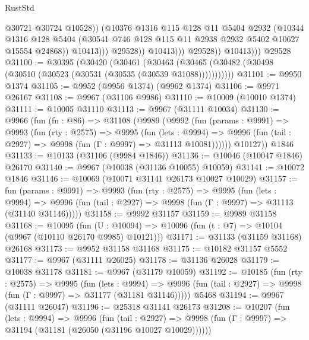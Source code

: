 \begin{lexlean}{RustStd}
\begin{coremodule}
                                @30721
                                @30724
                                @10528))
                            (@10376
                              @1316
                              @115
                              @128
                              @11
                              @5404
                              @2932
                              (@10344
                                @1316
                                @128
                                @5404
                                (@30541 @746 @128 @115 @11 @2938 @2932 @5402 @10627 @15554 @24868))
                              @10413)))
                        @29528))
                    @10413)))
              @29528))
          @10413)))
    @29528
@31100 := @30395
    (@30420
      (@30461
        (@30463 (@30465 (@30482 (@30498 (@30510 (@30523 (@30531 (@30535 (@30539 @31088)))))))))))
@31101 := @9950 @1374
@31105 := @9952 (@9956 @1374) (@9962 @1374)
@31106 := @9971 @26167
@31108 := @9967 (@31106 @9986)
@31110 := @10009 (@10010 @1374)
@31111 := @10005 @31110
@31113 := @9967 (@31111 @10034)
@31130 := @9966
    (fun (fn : @86) =>
    @31108
      (@9989
        (@9992
          (fun (params : @9991) =>
          @9993
            (fun (rty : @2575) =>
            @9995
              (fun (lets : @9994) =>
              @9996 (fun (tail : @2927) => @9998 (fun (Γ : @9997) => @31113 @10081))))))
        @10127))
    @1846
@31133 := @10133 (@31106 (@9984 @1846))
@31136 := @10046 (@10047 @1846) @26170
@31140 := @9967 (@10038 (@31136 @10055) @10059)
@31141 := @10072 @1846
@31146 := @10069 (@10071 @31141 @26173 @10027 @10029)
@31157 := fun (params : @9991) =>
  @9993
    (fun (rty : @2575) =>
    @9995
      (fun (lets : @9994) =>
      @9996 (fun (tail : @2927) => @9998 (fun (Γ : @9997) => @31113 (@31140 @31146)))))
@31158 := @9992 @31157
@31159 := @9989 @31158
@31168 := @10095
    (fun (U : @10094) => @10096 (fun (t : @7) => @10104 (@9967 (@10110 @26170 @9985) @10121)))
@31171 := @31133 (@31159 @31168) @26168
@31173 := @9952 @31158 @31168
@31175 := @10182 @31157 @5552
@31177 := @9967 (@31111 @26025)
@31178 := @31136 @26028
@31179 := @10038 @31178
@31181 := @9967 (@31179 @10059)
@31192 := @10185
    (fun (rty : @2575) =>
    @9995
      (fun (lets : @9994) =>
      @9996 (fun (tail : @2927) => @9998 (fun (Γ : @9997) => @31177 (@31181 @31146)))))
    @5468
@31194 := @9967 (@31111 @26047)
@31196 := @25318 @31141 @26173
@31208 := @10207
    (fun (lets : @9994) =>
    @9996
      (fun (tail : @2927) =>
      @9998 (fun (Γ : @9997) => @31194 (@31181 (@26050 (@31196 @10027 @10029))))))

\end{coremodule}
\end{lexlean}
